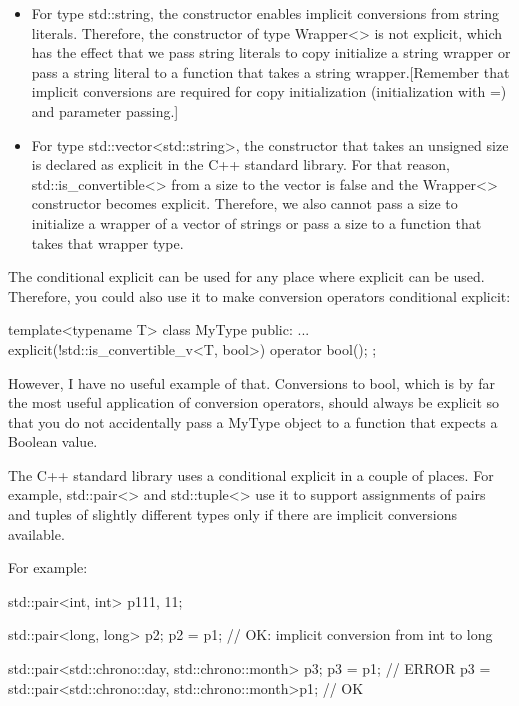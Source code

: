 \begin{itemize}
\item 
For type std::string, the constructor enables implicit conversions from string literals. Therefore, the constructor of type Wrapper<> is not explicit, which has the effect that we pass string literals to copy initialize a string wrapper or pass a string literal to a function that takes a string wrapper.[Remember that implicit conversions are required for copy initialization (initialization with =) and parameter passing.]

\item
For type std::vector<std::string>, the constructor that takes an unsigned size is declared as explicit in the C++ standard library. For that reason, std::is\_convertible<> from a size to the vector is false and the Wrapper<> constructor becomes explicit. Therefore, we also cannot pass a size to initialize a wrapper of a vector of strings or pass a size to a function that takes that wrapper type.
\end{itemize}

The conditional explicit can be used for any place where explicit can be used. Therefore, you could also use it to make conversion operators conditional explicit:

\begin{cpp}
template<typename T>
class MyType {
	public:
	...
	explicit(!std::is_convertible_v<T, bool>) operator bool();
};
\end{cpp}

However, I have no useful example of that. Conversions to bool, which is by far the most useful application of conversion operators, should always be explicit so that you do not accidentally pass a MyType object to a function that expects a Boolean value.


The C++ standard library uses a conditional explicit in a couple of places. For example, std::pair<> and std::tuple<> use it to support assignments of pairs and tuples of slightly different types only if there are implicit conversions available.

For example:

\begin{cpp}
std::pair<int, int> p1{11, 11};

std::pair<long, long> p2{};
p2 = p1; // OK: implicit conversion from int to long

std::pair<std::chrono::day, std::chrono::month> p3{};
p3 = p1; // ERROR
p3 = std::pair<std::chrono::day, std::chrono::month>{p1}; // OK
\end{cpp}

